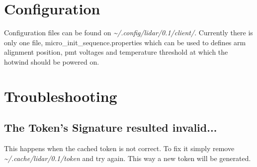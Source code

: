 \documentclass[letterpaper, 10 pt]{article}
\begin{document}
\section{Configuration}
Configuration files can be found on \textit{\~{}/.config/lidar/0.1/client/}. Currently there is only one file, micro\_init\_sequence.properties which can be used to defines arm alignment position, pmt voltages and temperature threshold at which the hotwind should be powered on.

\section{Troubleshooting}
\subsection{The Token's Signature resulted invalid...}
This happens when the cached token is not correct. To fix it simply remove \textit{\~{}/.cache/lidar/0.1/token} and try again. This way a new token will be generated.

\newpage

%
\end{document}
